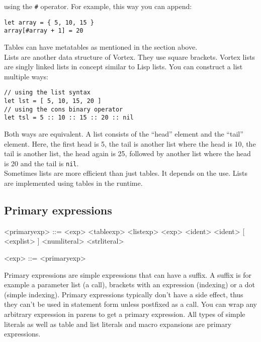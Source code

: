 \documentclass{article}
\newenvironment{bnf}
{
\begin{mdframed}
\begin{grammar}
}
{
\end{grammar}
\end{mdframed}
}
\begin{document}
using the \verb|#| operator. For example, this way you can append:
\begin{lstlisting}[language=vortex]
let array = { 5, 10, 15 }
array[#array + 1] = 20
\end{lstlisting}
Tables can have metatables as mentioned in the section above.\\
Lists are another data structure of Vortex. They use square brackets. Vortex
lists are singly linked lists in concept similar to Lisp lists. You can
construct a list multiple ways:
\begin{lstlisting}[language=vortex]
// using the list syntax
let lst = [ 5, 10, 15, 20 ]
// using the cons binary operator
let tsl = 5 :: 10 :: 15 :: 20 :: nil
\end{lstlisting}
Both ways are equivalent. A list consists of the \enquote{head} element
and the \enquote{tail} element. Here, the first head is 5, the tail is another
list where the head is 10, the tail is another list, the head again is 25,
followed by another list where the head is 20 and the tail is \verb|nil|.\\
Sometimes lists are more efficient than just tables. It depends on the use.
Lists are implemented using tables in the runtime.
\subsection{Primary expressions}
\begin{bnf}
<primaryexp> ::= \lit{(} <exp> \lit{)}
    \alt <tableexp>
    \alt <listexp>
    \alt \lit{\$(} <exp> \lit{)}
    \alt \lit{\$} <ident>
    \alt <ident> [ \lit{!} \lit{(} <explist> \lit{)} ]
    \alt <numliteral>
    \alt <strliteral>
    \alt {}
    \alt {}
    \alt {}

<exp> ::= <primaryexp>
\end{bnf}
Primary expressions are simple expressions that can have a suffix. A suffix
is for example a parameter list (a call), brackets with an expression
(indexing) or a dot (simple indexing). Primary expressions typically don't
have a side effect, thus they can't be used in statement form unless postfixed
as a call. You can wrap any arbitrary expression in parens to get a primary
expression. All types of simple literals as well as table and list literals
and macro expansions are primary expressions.
\end{document}
